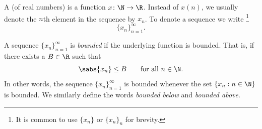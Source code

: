 \begin{defn}
A \emph{} (of real numbers) is a function $x \colon \N \to
\R$.  Instead of $x(n)$, we 
usually denote the $n$th element in the sequence by $x_n$.
To denote a sequence we write%
\footnote{It is common to use $\{ x_n \}$ or $\{ x_n \}_n$ for brevity.}%
%
\begin{equation*}
\{ x_n \}_{n=1}^\infty.
\end{equation*}

A sequence $\{ x_n \}_{n=1}^\infty$ is \emph{bounded} if
the underlying function is bounded.  That is, if
there exists a $B \in \R$ such that
\begin{equation*}
\sabs{x_n} \leq B \qquad \text{for all } n \in \N.
\end{equation*}
In other words, the sequence $\{x_n\}_{n=1}^\infty$ is bounded whenever
the set $\{ x_n : n \in \N \}$
is bounded.
We similarly define the words
\emph{bounded below} and
\emph{bounded above}.
\end{defn}
